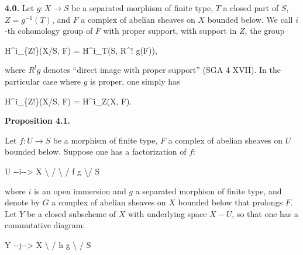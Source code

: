 \documentclass[
  11pt,
  a4paper,
]{book}
\newenvironment{Shaded}{}{}
\newcommand{\NormalTok}[1]{#1}
\begin{document}
\textbf{4.0.} Let \(g : X \to S\) be a separated morphism of finite
type, \(T\) a closed part of \(S\), \(Z = g^{-1}(T)\), and \(F\) a
complex of abelian sheaves on \(X\) bounded below. We call \(i\)-th
cohomology group of \(F\) with proper support, with support in \(Z\),
the group

\begin{Shaded}
\begin{Highlighting}[]
\NormalTok{H\^{}i\_\{Z!\}(X/S, F) = H\^{}i\_T(S, R\^{}! g(F)),}
\end{Highlighting}
\end{Shaded}

where \(R^{!} g\) denotes ``direct image with proper support'' (SGA 4
XVII). In the particular case where \(g\) is proper, one simply has

\begin{Shaded}
\begin{Highlighting}[]
\NormalTok{H\^{}i\_\{Z!\}(X/S, F) = H\^{}i\_Z(X, F).}
\end{Highlighting}
\end{Shaded}

\textbf{Proposition 4.1.}

Let \(f : U \to S\) be a morphism of finite type, \(F\) a complex of
abelian sheaves on \(U\) bounded below. Suppose one has a factorization
of \(f\):

\begin{Shaded}
\begin{Highlighting}[]
\NormalTok{U {-}{-}i{-}{-}\textgreater{} X}
\NormalTok{ \textbackslash{}      /}
\NormalTok{  \textbackslash{}    /}
\NormalTok{   f  g}
\NormalTok{    \textbackslash{}/}
\NormalTok{    S}
\end{Highlighting}
\end{Shaded}

where \(i\) is an open immersion and \(g\) a separated morphism of
finite type, and denote by \(G\) a complex of abelian sheaves on \(X\)
bounded below that prolongs \(F\). Let \(Y\) be a closed subscheme of
\(X\) with underlying space \(X - U\), so that one has a commutative
diagram:

\begin{Shaded}
\begin{Highlighting}[]
\NormalTok{Y {-}{-}j{-}{-}\textgreater{} X}
\NormalTok{ \textbackslash{}      /}
\NormalTok{  h    g}
\NormalTok{   \textbackslash{}  /}
\NormalTok{    S}
\end{Highlighting}
\end{Shaded}
\end{document}
